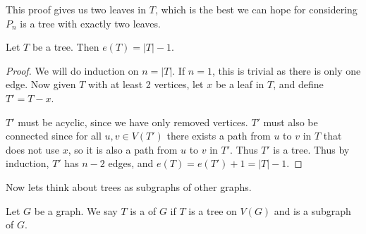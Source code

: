 \documentclass[a4paper]{scrartcl}
\begin{document}
\begin{remark}
	This proof gives us two leaves in $T$, which is the best we can hope for considering $P_n$ is a tree with exactly two leaves.
\end{remark}

\begin{proposition}
	Let $T$ be a tree. Then $e(T) = |T| - 1$.
\end{proposition}
\begin{proof}
	We will do induction on $n = |T|$. If $n = 1$, this is trivial as there is only one edge. Now given $T$ with at least 2 vertices, let $x$ be a leaf in $T$, and define $T' = T - x$.
	
	$T'$ must be acyclic, since we have only removed vertices. $T'$ must also be connected since for all $u, v \in V(T')$ there exists a path from $u$ to $v$ in $T$ that does not use $x$, so it is also a path from $u$ to $v$ in $T'$. Thus $T'$ is a tree.
	Thus by induction, $T'$ has $n - 2$ edges, and $e(T) = e(T') + 1 = |T| - 1$. 
\end{proof}

Now lets think about trees as subgraphs of other graphs.

\begin{definition}
	Let $G$ be a graph. We say $T$ is a  of $G$ if $T$ is a tree on $V(G)$ and is a subgraph of $G$.
\end{definition}
\end{document}
